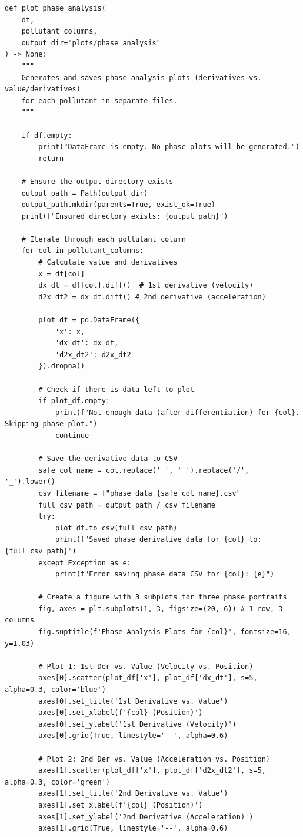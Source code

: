 \documentclass{exam_template}
\begin{document}
\begin{verbatim}
def plot_phase_analysis(
    df, 
    pollutant_columns, 
    output_dir="plots/phase_analysis"
) -> None:
    """
    Generates and saves phase analysis plots (derivatives vs. value/derivatives)
    for each pollutant in separate files.
    """
    
    if df.empty:
        print("DataFrame is empty. No phase plots will be generated.")
        return

    # Ensure the output directory exists
    output_path = Path(output_dir)
    output_path.mkdir(parents=True, exist_ok=True)
    print(f"Ensured directory exists: {output_path}")

    # Iterate through each pollutant column
    for col in pollutant_columns:
        # Calculate value and derivatives
        x = df[col]
        dx_dt = df[col].diff()  # 1st derivative (velocity)
        d2x_dt2 = dx_dt.diff() # 2nd derivative (acceleration)

        plot_df = pd.DataFrame({
            'x': x,
            'dx_dt': dx_dt,
            'd2x_dt2': d2x_dt2
        }).dropna()

        # Check if there is data left to plot
        if plot_df.empty:
            print(f"Not enough data (after differentiation) for {col}. Skipping phase plot.")
            continue
        
        # Save the derivative data to CSV
        safe_col_name = col.replace(' ', '_').replace('/', '_').lower()
        csv_filename = f"phase_data_{safe_col_name}.csv"
        full_csv_path = output_path / csv_filename
        try:
            plot_df.to_csv(full_csv_path)
            print(f"Saved phase derivative data for {col} to: {full_csv_path}")
        except Exception as e:
            print(f"Error saving phase data CSV for {col}: {e}")

        # Create a figure with 3 subplots for three phase portraits
        fig, axes = plt.subplots(1, 3, figsize=(20, 6)) # 1 row, 3 columns
        fig.suptitle(f'Phase Analysis Plots for {col}', fontsize=16, y=1.03)

        # Plot 1: 1st Der vs. Value (Velocity vs. Position)
        axes[0].scatter(plot_df['x'], plot_df['dx_dt'], s=5, alpha=0.3, color='blue')
        axes[0].set_title('1st Derivative vs. Value')
        axes[0].set_xlabel(f'{col} (Position)')
        axes[0].set_ylabel('1st Derivative (Velocity)')
        axes[0].grid(True, linestyle='--', alpha=0.6)

        # Plot 2: 2nd Der vs. Value (Acceleration vs. Position)
        axes[1].scatter(plot_df['x'], plot_df['d2x_dt2'], s=5, alpha=0.3, color='green')
        axes[1].set_title('2nd Derivative vs. Value')
        axes[1].set_xlabel(f'{col} (Position)')
        axes[1].set_ylabel('2nd Derivative (Acceleration)')
        axes[1].grid(True, linestyle='--', alpha=0.6)


\end{verbatim}
\end{document}
